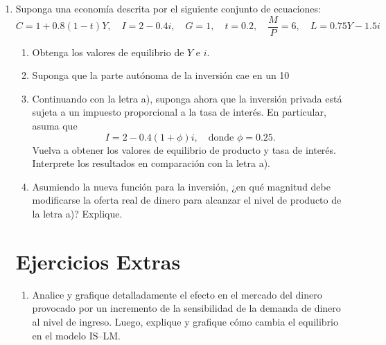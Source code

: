 \documentclass[11pt,addpoints]{article}
\begin{document}
\begin{enumerate}
\begin{enumerate}[label=\alph*)]
\item Determine la ecuación de las curvas IS y LM.  
\item Determine la tasa de interés e \(Y\) en el equilibrio.  
\item Si el gobierno decide incrementar el gasto público, ¿cómo varía el nivel de producción?  
\item Si el nivel de precios se incrementa, ¿qué implicancias tiene el modelo?  
\end{enumerate}

\item Suponga una economía descrita por el siguiente conjunto de ecuaciones:
\[
C = 1 + 0.8(1 - t)Y, \quad I = 2 - 0.4i, \quad G = 1, \quad t = 0.2, \quad \frac{M}{P} = 6, \quad L = 0.75Y - 1.5i
\]

\begin{enumerate}[label=\alph*)]
\item Obtenga los valores de equilibrio de \(Y\) e \(i\).  
\item Suponga que la parte autónoma de la inversión cae en un 10 %
\item Continuando con la letra a), suponga ahora que la inversión privada está sujeta a un impuesto proporcional a la tasa de interés. En particular, asuma que  
\[
I = 2 - 0.4(1 + \phi)i, \quad \text{donde } \phi = 0.25.
\]
Vuelva a obtener los valores de equilibrio de producto y tasa de interés. Interprete los resultados en comparación con la letra a).  

\newpage
\vspace*{0.1cm}
\item Asumiendo la nueva función para la inversión, ¿en qué magnitud debe modificarse la oferta real de dinero para alcanzar el nivel de producto de la letra a)? Explique.  
\end{enumerate}

\section*{Ejercicios Extras}

\begin{enumerate}[label=\arabic*.]
\item Analice y grafique detalladamente el efecto en el mercado del dinero provocado por un incremento de la sensibilidad de la demanda de dinero al nivel de ingreso.  
Luego, explique y grafique cómo cambia el equilibrio en el modelo IS–LM.  


\end{enumerate}
\end{enumerate}
\end{document}
